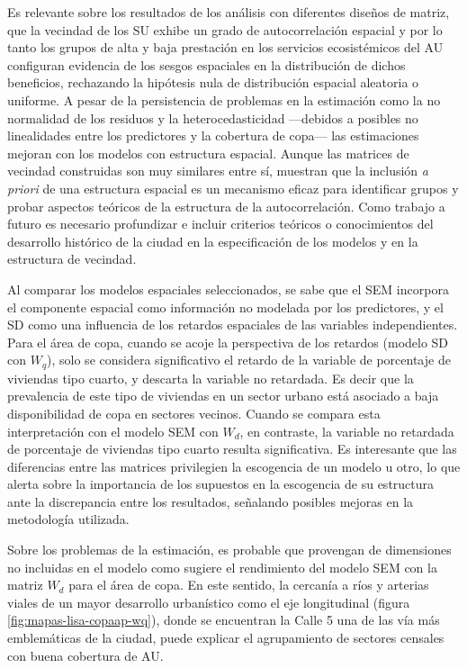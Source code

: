 \documentclass[12pt,a4paper,openany]{book}
\theoremstyle{definition}
\theoremstyle{definition}
\theoremstyle{definition}
\theoremstyle{remark}
\begin{document}
Es relevante sobre los resultados de los análisis con diferentes diseños
de matriz, que la vecindad de los SU exhibe un grado de autocorrelación
espacial y por lo tanto los grupos de alta y baja prestación en los
servicios ecosistémicos del AU configuran evidencia de los sesgos
espaciales en la distribución de dichos beneficios, rechazando la
hipótesis nula de distribución espacial aleatoria o uniforme. A pesar de
la persistencia de problemas en la estimación como la no normalidad de
los residuos y la heterocedasticidad ---debidos a posibles no
linealidades entre los predictores y la cobertura de copa--- las
estimaciones mejoran con los modelos con estructura espacial. Aunque las
matrices de vecindad construidas son muy similares entre sí, muestran
que la inclusión \emph{a priori} de una estructura espacial es un
mecanismo eficaz para identificar grupos y probar aspectos teóricos de
la estructura de la autocorrelación. Como trabajo a futuro es necesario
profundizar e incluir criterios teóricos o conocimientos del desarrollo
histórico de la ciudad en la especificación de los modelos y en la
estructura de vecindad.

Al comparar los modelos espaciales seleccionados, se sabe que el SEM
incorpora el componente espacial como información no modelada por los
predictores, y el SD como una influencia de los retardos espaciales de
las variables independientes. Para el área de copa, cuando se acoje la
perspectiva de los retardos (modelo SD con \(W_q\)), solo se considera
significativo el retardo de la variable de porcentaje de viviendas tipo
cuarto, y descarta la variable no retardada. Es decir que la prevalencia
de este tipo de viviendas en un sector urbano está asociado a baja
disponibilidad de copa en sectores vecinos. Cuando se compara esta
interpretación con el modelo SEM con \(W_d\), en contraste, la variable
no retardada de porcentaje de viviendas tipo cuarto resulta
significativa. Es interesante que las diferencias entre las matrices
privilegien la escogencia de un modelo u otro, lo que alerta sobre la
importancia de los supuestos en la escogencia de su estructura ante la
discrepancia entre los resultados, señalando posibles mejoras en la
metodología utilizada.

Sobre los problemas de la estimación, es probable que provengan de
dimensiones no incluidas en el modelo como sugiere el rendimiento del
modelo SEM con la matriz \(W_d\) para el área de copa. En este sentido,
la cercanía a ríos y arterias viales de un mayor desarrollo urbanístico
como el eje longitudinal (figura \ref{fig:mapas-lisa-copaap-wq}), donde
se encuentran la Calle 5 una de las vía más emblemáticas de la ciudad,
puede explicar el agrupamiento de sectores censales con buena cobertura
de AU.
\end{document}
